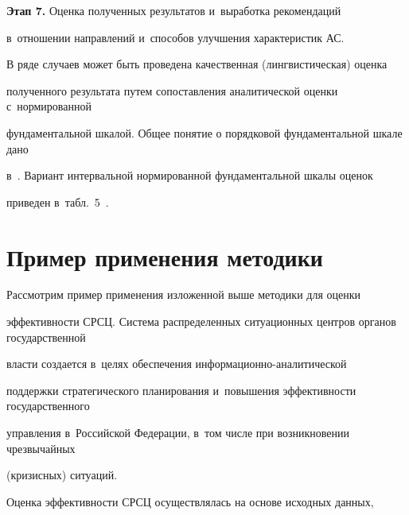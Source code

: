 \setcounter{figure}{2}

\addtocounter{table}{1}



\renewcommand{\figurename}{\protect\bf Рис.}

\renewcommand{\tablename}{\protect\bf Таблица}

      

      \textbf{Этап 7.} Оценка полученных результатов и~выработка рекомендаций 

      в~отношении направлений и~способов улучшения характеристик АС.

      

      В ряде случаев может быть проведена качественная (лингвистическая) оценка 

полученного результата путем сопоставления аналитической оценки с~нормированной 

фундаментальной шкалой. Общее понятие о порядковой фундаментальной шкале дано 

в~\cite{8-zo}. Вариант интервальной нормированной фундаментальной шкалы оценок 

приведен в~табл.~5~\cite{12-zo}.

      

\vspace*{-8pt}

      

\section{Пример применения методики}



\vspace*{-2pt}



      Рассмотрим пример применения изложенной выше методики для оценки 

эффективности СРСЦ. Система распределенных ситуационных центров органов государственной  

власти создается в~целях обеспечения ин\-фор\-ма\-ци\-он\-но-ана\-ли\-ти\-че\-ской 

поддержки стратегического планирования и~повышения эффективности государственного 

управления в~Российской Федерации, в~том числе при возникновении чрезвычайных 

(кризисных) ситуаций.

      

      Оценка эффективности СРСЦ осуществлялась на основе исходных данных, 

